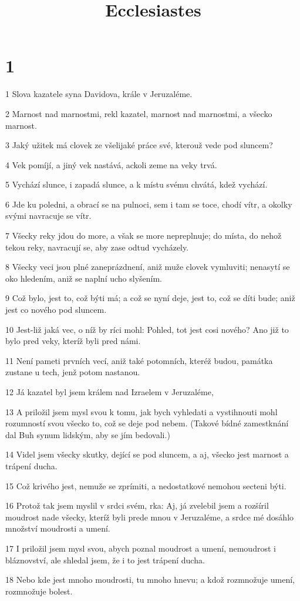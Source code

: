 

\title{Ecclesiastes}

\chapter{1}

\par 1 Slova kazatele syna Davidova, krále v Jeruzaléme.
\par 2 Marnost nad marnostmi, rekl kazatel, marnost nad marnostmi, a všecko marnost.
\par 3 Jaký užitek má clovek ze všelijaké práce své, kterouž vede pod sluncem?
\par 4 Vek pomíjí, a jiný vek nastává, ackoli zeme na veky trvá.
\par 5 Vychází slunce, i zapadá slunce, a k místu svému chvátá, kdež vychází.
\par 6 Jde ku poledni, a obrací se na pulnoci, sem i tam se toce, chodí vítr, a okolky svými navracuje se vítr.
\par 7 Všecky reky jdou do more, a však se more nepreplnuje; do místa, do nehož tekou reky, navracují se, aby zase odtud vycházely.
\par 8 Všecky veci jsou plné zaneprázdnení, aniž muže clovek vymluviti; nenasytí se oko hledením, aniž se naplní ucho slyšením.
\par 9 Což bylo, jest to, což býti má; a což se nyní deje, jest to, což se díti bude; aniž jest co nového pod sluncem.
\par 10 Jest-liž jaká vec, o níž by ríci mohl: Pohled, tot jest cosi nového? Ano již to bylo pred veky, kteríž byli pred námi.
\par 11 Není pameti prvních vecí, aniž také potomních, kteréž budou, památka zustane u tech, jenž potom nastanou.
\par 12 Já kazatel byl jsem králem nad Izraelem v Jeruzaléme,
\par 13 A priložil jsem mysl svou k tomu, jak bych vyhledati a vystihnouti mohl rozumností svou všecko to, což se deje pod nebem. (Takové bídné zamestknání dal Buh synum lidským, aby se jím bedovali.)
\par 14 Videl jsem všecky skutky, dející se pod sluncem, a aj, všecko jest marnost a trápení ducha.
\par 15 Což krivého jest, nemuže se zprímiti, a nedostatkové nemohou secteni býti.
\par 16 Protož tak jsem myslil v srdci svém, rka: Aj, já zvelebil jsem a rozšíril moudrost nade všecky, kteríž byli prede mnou v Jeruzaléme, a srdce mé dosáhlo množství moudrosti a umení.
\par 17 I priložil jsem mysl svou, abych poznal moudrost a umení, nemoudrost i bláznovství, ale shledal jsem, že i to jest trápení ducha.
\par 18 Nebo kde jest mnoho moudrosti, tu mnoho hnevu; a kdož rozmnožuje umení, rozmnožuje bolest.

